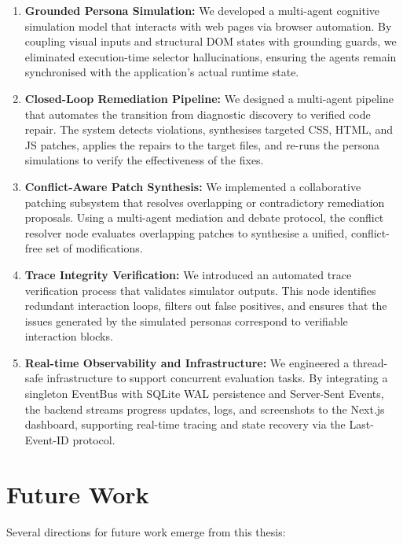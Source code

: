 \begin{enumerate}
  \item \textbf{Grounded Persona Simulation:} We developed a multi-agent cognitive simulation model that interacts with web pages via browser automation. By coupling visual inputs and structural DOM states with grounding guards, we eliminated execution-time selector hallucinations, ensuring the agents remain synchronised with the application's actual runtime state.
  \item \textbf{Closed-Loop Remediation Pipeline:} We designed a multi-agent pipeline that automates the transition from diagnostic discovery to verified code repair. The system detects violations, synthesises targeted CSS, HTML, and JS patches, applies the repairs to the target files, and re-runs the persona simulations to verify the effectiveness of the fixes.
  \item \textbf{Conflict-Aware Patch Synthesis:} We implemented a collaborative patching subsystem that resolves overlapping or contradictory remediation proposals. Using a multi-agent mediation and debate protocol, the conflict resolver node evaluates overlapping patches to synthesise a unified, conflict-free set of modifications.
  \item \textbf{Trace Integrity Verification:} We introduced an automated trace verification process that validates simulator outputs. This node identifies redundant interaction loops, filters out false positives, and ensures that the issues generated by the simulated personas correspond to verifiable interaction blocks.
  \item \textbf{Real-time Observability and Infrastructure:} We engineered a thread-safe infrastructure to support concurrent evaluation tasks. By integrating a singleton EventBus with SQLite WAL persistence and Server-Sent Events, the backend streams progress updates, logs, and screenshots to the Next.js dashboard, supporting real-time tracing and state recovery via the Last-Event-ID protocol.
\end{enumerate}


\section{Future Work}
\label{sec:future-work}

Several directions for future work emerge from this thesis:

